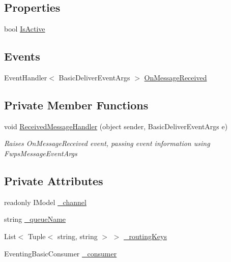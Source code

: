 \subsection*{Properties}
\begin{DoxyCompactItemize}
\item 
bool \mbox{\hyperlink{class_master_application_1_1_threads_1_1_fwps_listener_afd19d33b9743b159b65c95b009c80331}{Is\+Active}}
\end{DoxyCompactItemize}
\subsection*{Events}
\begin{DoxyCompactItemize}
\item 
Event\+Handler$<$ Basic\+Deliver\+Event\+Args $>$ \mbox{\hyperlink{class_master_application_1_1_threads_1_1_fwps_listener_a800200e774b70976a987207845b6f953}{On\+Message\+Received}}
\end{DoxyCompactItemize}
\subsection*{Private Member Functions}
\begin{DoxyCompactItemize}
\item 
void \mbox{\hyperlink{class_master_application_1_1_threads_1_1_fwps_listener_af666026eb89f076643628aa181a05fc5}{Received\+Message\+Handler}} (object sender, Basic\+Deliver\+Event\+Args e)
\begin{DoxyCompactList}\small\item\em Raises \textquotesingle{}On\+Message\+Received\textquotesingle{} event, passing event information using Fwps\+Message\+Event\+Args \end{DoxyCompactList}\end{DoxyCompactItemize}
\subsection*{Private Attributes}
\begin{DoxyCompactItemize}
\item 
readonly I\+Model \mbox{\hyperlink{class_master_application_1_1_threads_1_1_fwps_listener_a8d6cc4e90a3fd4ceeef1605a748c7445}{\+\_\+channel}}
\item 
string \mbox{\hyperlink{class_master_application_1_1_threads_1_1_fwps_listener_a03705945da2d45b42a55f203a99eea2d}{\+\_\+queue\+Name}}
\item 
List$<$ Tuple$<$ string, string $>$ $>$ \mbox{\hyperlink{class_master_application_1_1_threads_1_1_fwps_listener_af542284d90e072bafc52083ae3b82a05}{\+\_\+routing\+Keys}}
\item 
Eventing\+Basic\+Consumer \mbox{\hyperlink{class_master_application_1_1_threads_1_1_fwps_listener_ad761b87b72db12dafd37930574ac1cb2}{\+\_\+consumer}}
\end{DoxyCompactItemize}


